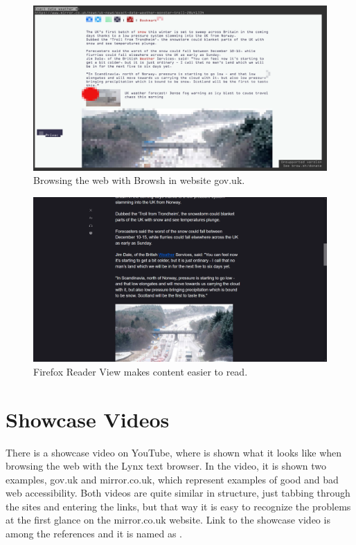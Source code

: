 \begin{figure}[tp]
\centering
\includegraphics[keepaspectratio,width=\linewidth,height=\halfh]
{images/browsh.png}

\caption[Browsh Graphical CLI Browser]
{%
Browsing the web with Browsh in website gov.uk.
}%
\label{fig:browsh}
\end{figure}


\begin{figure}[tp]
\centering
\includegraphics[keepaspectratio,width=\linewidth,height=\halfh]
{images/reader-view.png}

\caption[Firefox Reader View]
{%
Firefox Reader View makes content easier to read.
}%
\label{fig:firefox-rv}
\end{figure}


\section{Showcase Videos}%
\label{sec:tb-showcase}

There is a showcase video on YouTube, where is shown what it looks
like when browsing the web with the Lynx text browser. In the video, it
is shown two examples, gov.uk and mirror.co.uk, which represent 
examples of good and bad web accessibility. Both videos are quite
similar in structure, just tabbing through the sites and entering the
links, but that way it is easy to recognize the problems at the first
glance on the mirror.co.uk website. Link to the showcase video is 
among the references and it is named as \textcite{tb-showcase}.


